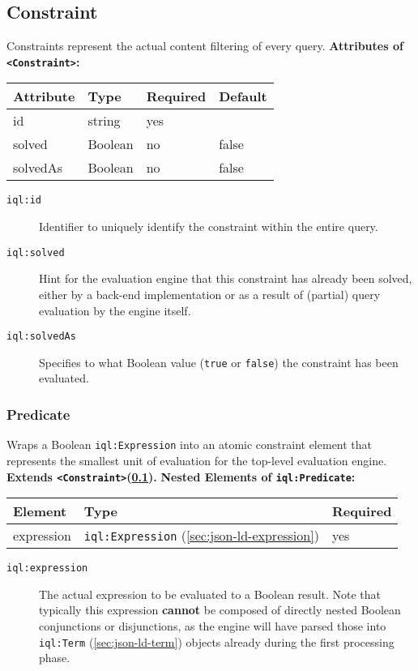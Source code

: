 \documentclass[11pt,a4paper,portrait]{article}
\newcommand{\iqlns}{iql:}
\newcommand{\iqlType}[1]{\texttt{\iqlns#1}}
\newcommand{\iqlBaseType}[1]{\texttt{\textless#1\textgreater}}
\newcommand{\desc}[1]{\noindent#1\newline\medskip}
\newcommand{\extends}[2]{\noindent\textbf{Extends #1(#2).}\newline\medskip}
\newenvironment{attributes}[1]{
\noindent\textbf{Attributes of #1:}\newline\medskip
\begin{tabular}{|p{0.3\textwidth}|p{0.20\textwidth}|p{0.20\textwidth}|p{0.17\textwidth}|}
	\hline
	\textbf{Attribute} & \textbf{Type} & \textbf{Required} & \textbf{Default} \\ 
	\hline
	\hline
}{
\end{tabular}
}
\newcommand{\attribute}[4]{
	#1 & #2 & #3 & #4 \\
	\hline
}
\newenvironment{elements}[1]{
\noindent\textbf{Nested Elements of #1:}\newline\medskip
\begin{tabular}{|p{0.3\textwidth}|p{0.42\textwidth}|p{0.17\textwidth}|}
	\hline
	\textbf{Element} & \textbf{Type} & \textbf{Required} \\ 
	\hline
	\hline
}{
\end{tabular}
}
\newcommand{\element}[3]{
#1 & #2 & #3 \\
\hline
}
\begin{document}
\subsection{Constraint}
\label{sec:json-ld-constraint}
\desc{Constraints represent the actual content filtering of every query.}
\begin{attributes}{\iqlBaseType{Constraint}}
	\attribute{id}{string}{yes}{}
	\attribute{solved}{Boolean}{no}{false}
	\attribute{solvedAs}{Boolean}{no}{false}
\end{attributes}
\begin{description}
	\item[\iqlType{id}] Identifier to uniquely identify the constraint within the entire query.
	\item[\iqlType{solved}] Hint for the evaluation engine that this constraint has already been solved, either by a back-end implementation or as a result of (partial) query evaluation by the engine itself.
	\item[\iqlType{solvedAs}] Specifies to what Boolean value (\texttt{true} or \texttt{false}) the constraint has been evaluated.
\end{description}

\subsubsection{Predicate}
\label{sec:json-ld-predicate}
\desc{Wraps a Boolean \iqlType{Expression} into an atomic constraint element that represents the smallest unit of evaluation for the top-level evaluation engine.}
\extends{\iqlBaseType{Constraint}}{\ref{sec:json-ld-constraint}}
\begin{elements}{\iqlType{Predicate}}
	\element{expression}{\iqlType{Expression} (\ref{sec:json-ld-expression})}{yes}
\end{elements}
\begin{description}
	\item[\iqlType{expression}] The actual expression to be evaluated to a Boolean result. Note that typically this expression \textbf{cannot} be composed of directly nested Boolean conjunctions or disjunctions, as the engine will have parsed those into \iqlType{Term} (\ref{sec:json-ld-term}) objects already during the first processing phase.
\end{description}
\end{document}
